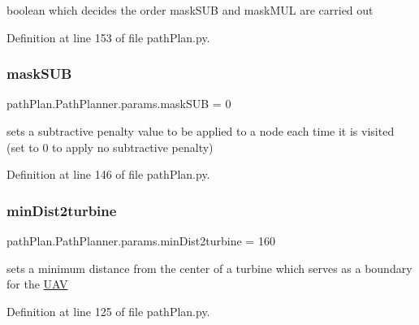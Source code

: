 boolean which decides the order mask\+S\+UB and mask\+M\+UL are carried out 



Definition at line 153 of file path\+Plan.\+py.

\mbox{\label{classpath_plan_1_1_path_planner_1_1params_a77d0a7a4d564dde6ce911fd1a25fdd31}} 
\subsubsection{\texorpdfstring{mask\+S\+UB}{maskSUB}}
{\footnotesize\ttfamily path\+Plan.\+Path\+Planner.\+params.\+mask\+S\+UB = 0\hspace{0.3cm}{\ttfamily [static]}}



sets a subtractive penalty value to be applied to a node each time it is visited (set to 0 to apply no subtractive penalty) 



Definition at line 146 of file path\+Plan.\+py.

\mbox{\label{classpath_plan_1_1_path_planner_1_1params_a839dcb73ab2c3b44e4b2f66d9134bfe7}} 
\subsubsection{\texorpdfstring{min\+Dist2turbine}{minDist2turbine}}
{\footnotesize\ttfamily path\+Plan.\+Path\+Planner.\+params.\+min\+Dist2turbine = 160\hspace{0.3cm}{\ttfamily [static]}}



sets a minimum distance from the center of a turbine which serves as a boundary for the \mbox{\hyperlink{classpath_plan_1_1_u_a_v}{U\+AV}} 



Definition at line 125 of file path\+Plan.\+py.

